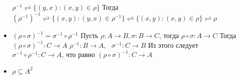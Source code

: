 \documentclass{report}
\begin{document}
\begin{itemize}
          $\rho^{-1} \rightleftharpoons \{(y,x): (x,y) \in \rho\}$\newline
          Тогда $(\rho^{-1})^{-1} \rightleftharpoons
              \{(x,y): (y,x) \in \rho^{-1}\} \rightleftharpoons
              \{(x,y): (x,y) \in \rho\} \rightleftharpoons \rho$
    \item $(\rho \circ \sigma)^{-1} = \sigma^{-1} \circ \rho^{-1}$\newline
          Пусть $\rho: A \rightarrow B, \sigma: B \rightarrow C$, тогда $\rho \circ \sigma: A \rightarrow C$\newline
          Тогда $(\rho \circ \sigma)^{-1}: C \rightarrow A$\newline
          $\rho^{-1}: B \rightarrow A,\mbox{ } \sigma^{-1}: C \rightarrow B$\newline
          Из этого следует $\sigma^{-1} \circ \rho^{-1}: C \rightarrow A$, что равно $(\rho \circ \sigma)^{-1}:C \rightarrow A$
    \item $\rho \subseteq A^{2}$

\end{itemize}
\end{document}
